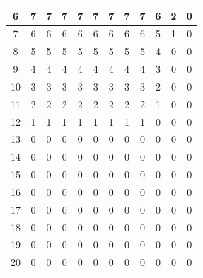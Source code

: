 \documentclass[11pt,a4paper,oneside]{report}
\begin{document}
\begin{table}[H]
\begin{tabular}{|c|c|c|c|c|c|c|c|c|c|c|c|}
6                & 7          & 7          & 7          & 7          & 7          & 7          & 7          & 7          & 6          & 2          & 0           \\ \hline
7                & 6          & 6          & 6          & 6          & 6          & 6          & 6          & 6          & 5          & 1          & 0           \\ \hline
8                & 5          & 5          & 5          & 5          & 5          & 5          & 5          & 5          & 4          & 0          & 0           \\ \hline
9                & 4          & 4          & 4          & 4          & 4          & 4          & 4          & 4          & 3          & 0          & 0           \\ \hline
10               & 3          & 3          & 3          & 3          & 3          & 3          & 3          & 3          & 2          & 0          & 0           \\ \hline
11               & 2          & 2          & 2          & 2          & 2          & 2          & 2          & 2          & 1          & 0          & 0           \\ \hline
12               & 1          & 1          & 1          & 1          & 1          & 1          & 1          & 1          & 0          & 0          & 0           \\ \hline
13               & 0          & 0          & 0          & 0          & 0          & 0          & 0          & 0          & 0          & 0          & 0           \\ \hline
14               & 0          & 0          & 0          & 0          & 0          & 0          & 0          & 0          & 0          & 0          & 0           \\ \hline
15               & 0          & 0          & 0          & 0          & 0          & 0          & 0          & 0          & 0          & 0          & 0           \\ \hline
16               & 0          & 0          & 0          & 0          & 0          & 0          & 0          & 0          & 0          & 0          & 0           \\ \hline
17               & 0          & 0          & 0          & 0          & 0          & 0          & 0          & 0          & 0          & 0          & 0           \\ \hline
18               & 0          & 0          & 0          & 0          & 0          & 0          & 0          & 0          & 0          & 0          & 0           \\ \hline
19               & 0          & 0          & 0          & 0          & 0          & 0          & 0          & 0          & 0          & 0          & 0           \\ \hline
20               & 0          & 0          & 0          & 0          & 0          & 0          & 0          & 0          & 0          & 0          & 0           \\ \hline
\end{tabular}
\end{table} 
\end{document}
